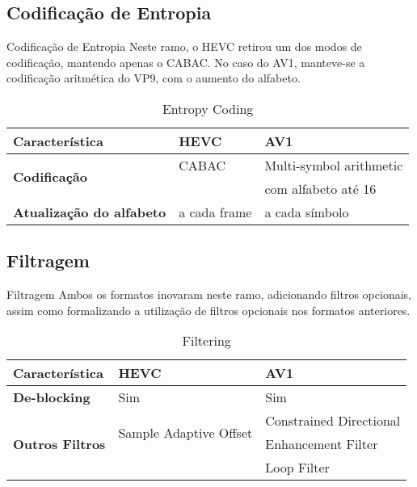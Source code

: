 \documentclass{beamer}
\begin{document}
\subsection{Codificação de Entropia}
\begin{frame}{Codificação de Entropia}
	Neste ramo, o HEVC retirou um dos modos de codificação, mantendo apenas o CABAC. No caso do AV1, manteve-se a codificação aritmética do VP9, com o aumento do alfabeto.
	\begin{table}
		\centering
		\begin{tabular}{l|l|l}
			\textbf{Característica} 													& \textbf{HEVC} 	& \textbf{AV1} \\\hline
			\multirow{2}{*}{\textbf{Codificação}}							& CABAC			 			& Multi-symbol arithmetic \\
			&									& com alfabeto até 16 \\
			\textbf{Atualização do alfabeto}									& a cada frame		& a cada símbolo \\
		\end{tabular}
		\caption{\label{tab:entropy}Entropy Coding}
	\end{table}
\end{frame}

\subsection{Filtragem}
\begin{frame}{Filtragem}
	Ambos os formatos inovaram neste ramo, adicionando filtros opcionais, assim como formalizando a utilização de filtros opcionais nos formatos anteriores.
	\begin{table}
		\centering
		\begin{tabular}{l|l|l}
			\textbf{Característica} 													& \textbf{HEVC} 	& \textbf{AV1} \\\hline
			\textbf{De-blocking}															& Sim			 				& Sim \\
			\multirow{3}{*}{\textbf{Outros Filtros}}					&	\multirow{2}{*}{Sample Adaptive Offset}	& Constrained Directional \\
			&													&  Enhancement Filter\\
			&													&	Loop Filter \\
		\end{tabular}
		\caption{\label{tab:filtering}Filtering}
	\end{table}
\end{frame}

\end{document}
